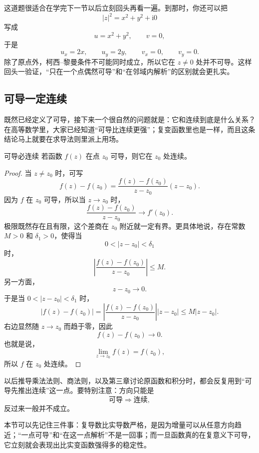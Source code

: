 \begin{tishi}[把这道题留作下一节的回头检验]
这道题很适合在学完下一节以后立刻回头再看一遍。到那时，你还可以把
\[
    |z|^2=x^2+y^2+\mathrm{i}0
\]
写成
\[
    u=x^2+y^2,\qquad v=0,
\]
于是
\[
    u_x=2x,\qquad u_y=2y,\qquad v_x=0,\qquad v_y=0.
\]
除了原点外，柯西--黎曼条件不可能同时成立，所以它在 $z\neq 0$ 处并不可导。这样回头一验证，``只在一个点偶然可导''和``在邻域内解析''的区别就会更扎实。
\end{tishi}

\subsection{可导一定连续}

既然已经定义了可导，接下来一个很自然的问题就是：它和连续到底是什么关系？在高等数学里，大家已经知道``可导比连续更强''；复变函数里也是一样，而且这条结论马上就要在求导法则里派上用场。

\begin{dingli}{可导必连续}{}
若函数 $f(z)$ 在点 $z_0$ 可导，则它在 $z_0$ 处连续。
\end{dingli}

\begin{proof}
当 $z\neq z_0$ 时，可写
\[
    f(z)-f(z_0)
    =\frac{f(z)-f(z_0)}{z-z_0}(z-z_0).
\]
因为 $f$ 在 $z_0$ 可导，所以当 $z\to z_0$ 时，
\[
    \frac{f(z)-f(z_0)}{z-z_0}\to f'(z_0).
\]
极限既然存在且有限，这个差商在 $z_0$ 附近就一定有界。更具体地说，存在常数 $M>0$ 和 $\delta_1>0$，使得当
\[
    0<|z-z_0|<\delta_1
\]
时，
\[
    \left|\frac{f(z)-f(z_0)}{z-z_0}\right|\le M.
\]
另一方面，
\[
    z-z_0\to 0.
\]
于是当 $0<|z-z_0|<\delta_1$ 时，
\[
    |f(z)-f(z_0)|
    =\left|\frac{f(z)-f(z_0)}{z-z_0}\right||z-z_0|
    \le M|z-z_0|.
\]
右边显然随 $z\to z_0$ 而趋于零，因此
\[
    f(z)-f(z_0)\to 0.
\]
也就是说，
\[
    \lim_{z\to z_0}f(z)=f(z_0),
\]
所以 $f$ 在 $z_0$ 处连续。
\end{proof}

\begin{tishi}[为什么这条结论值得单独记住]
以后推导乘法法则、商法则，以及第三章讨论原函数和积分时，都会反复用到``可导先推出连续''这一点。要特别注意：方向只能是
\[
    \text{可导}\Longrightarrow \text{连续},
\]
反过来一般并不成立。

本节可以先记住三件事：复导数比实导数严格，是因为增量可以从任意方向趋近；``一点可导''和``在这一点解析''不是一回事；而一旦函数真的在复意义下可导，它立刻就会表现出比实变函数强得多的稳定性。
\end{tishi}

